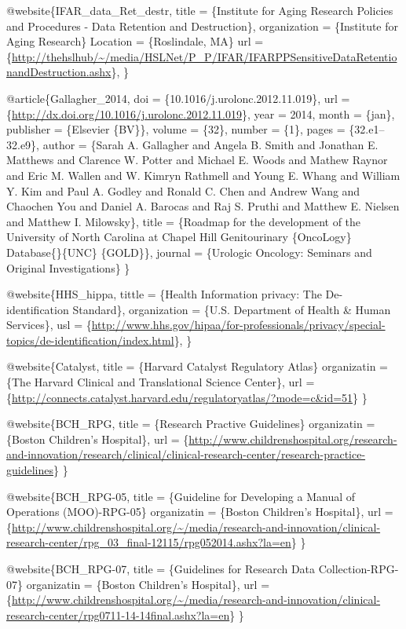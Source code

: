 \documentclass[]{book}
\theoremstyle{definition}
\theoremstyle{definition}
\theoremstyle{definition}
\theoremstyle{remark}
\begin{document}
@website\{IFAR\_data\_Ret\_destr, title = \{Institute for Aging Research
Policies and Procedures - Data Retention and Destruction\}, organization
= \{Institute for Aging Research\} Location = \{Roslindale, MA\} url =
\{\url{http://thehslhub/~/media/HSLNet/P_P/IFAR/IFARPPSensitiveDataRetentionandDestruction.ashx}\},
\}

@article\{Gallagher\_2014, doi = \{10.1016/j.urolonc.2012.11.019\}, url
= \{\url{http://dx.doi.org/10.1016/j.urolonc.2012.11.019}\}, year =
2014, month = \{jan\}, publisher = \{Elsevier \{BV\}\}, volume = \{32\},
number = \{1\}, pages = \{32.e1--32.e9\}, author = \{Sarah A. Gallagher
and Angela B. Smith and Jonathan E. Matthews and Clarence W. Potter and
Michael E. Woods and Mathew Raynor and Eric M. Wallen and W. Kimryn
Rathmell and Young E. Whang and William Y. Kim and Paul A. Godley and
Ronald C. Chen and Andrew Wang and Chaochen You and Daniel A. Barocas
and Raj S. Pruthi and Matthew E. Nielsen and Matthew I. Milowsky\},
title = \{Roadmap for the development of the University of North
Carolina at Chapel Hill Genitourinary \{OncoLogy\}
Database\{\textemdash\}\{UNC\} \{GOLD\}\}, journal = \{Urologic
Oncology: Seminars and Original Investigations\} \}

@website\{HHS\_hippa, tittle = \{Health Information privacy: The
De-identification Standard\}, organization = \{U.S. Department of Health
\& Human Services\}, usl =
\{\url{http://www.hhs.gov/hipaa/for-professionals/privacy/special-topics/de-identification/index.html}\},
\}

@website\{Catalyst, title = \{Harvard Catalyst Regulatory Atlas\}
organizatin = \{The Harvard Clinical and Translational Science Center\},
url =
\{\url{http://connects.catalyst.harvard.edu/regulatoryatlas/?mode=c\&id=51}\}
\}

@website\{BCH\_RPG, title = \{Research Practive Guidelines\} organizatin
= \{Boston Children's Hospital\}, url =
\{\url{http://www.childrenshospital.org/research-and-innovation/research/clinical/clinical-research-center/research-practice-guidelines}\}
\}

@website\{BCH\_RPG-05, title = \{Guideline for Developing a Manual of
Operations (MOO)-RPG-05\} organizatin = \{Boston Children's Hospital\},
url =
\{\url{http://www.childrenshospital.org/~/media/research-and-innovation/clinical-research-center/rpg_03_final-12115/rpg052014.ashx?la=en}\}
\}

@website\{BCH\_RPG-07, title = \{Guidelines for Research Data
Collection-RPG-07\} organizatin = \{Boston Children's Hospital\}, url =
\{\url{http://www.childrenshospital.org/~/media/research-and-innovation/clinical-research-center/rpg0711-14-14final.ashx?la=en}\}
\}
\end{document}
